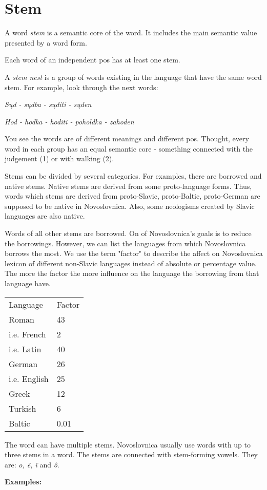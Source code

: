 \section{Stem}

A word \textit{stem} is a semantic core of the word. It includes the main semantic value presented by a word form.

Each word of an independent \gls{pos} has at least one stem.

A \textit{stem nest} is a group of words existing in the language that have the same word stem. For example, look through the next words:

\textit{Sųd - sųdba - sųditi - sųden}

\textit{Hod - hodka - hoditi - poholdka - zahoden}

You see the words are of different meanings and different \gls{pos}. Thought, every word in each group has an equal semantic core - something connected with the judgement (1) or with walking (2).

Stems can be divided by several categories. For examples, there are borrowed and native stems. Native stems are derived from some proto-language forms. Thus, words which stems are derived from proto-Slavic, proto-Baltic, proto-German are supposed to be native in Novoslovnica. Also, some neologisms created by Slavic languages are also native.

Words of all other stems are borrowed. On of Novoslovnica's goals is to reduce the borrowings. However, we can list the languages from which Novoslovnica borrows the most. We use the term "factor" to describe the affect on Novoslovnica lexicon of different non-Slavic languages instead of absolute or percentage value. The more the factor the more influence on the language the borrowing from that language have.

\begin{table}
	\begin{tabular}{ll}
		Language & Factor \\
		Roman & 43 \\
		i.e. French & 2 \\
		i.e. Latin & 40 \\
		German & 26 \\
		i.e. English & 25 \\
		Greek & 12 \\ 
		Turkish & 6 \\
		Baltic & 0.01 \\
	\end{tabular}
\end{table}

The word can have multiple stems. Novoslovnica usually use words with up to three stems in a word. The stems are connected with stem-forming vowels. They are: \textit{o, ë, ï} and \textit{ô}.

\textbf{Examples:}

